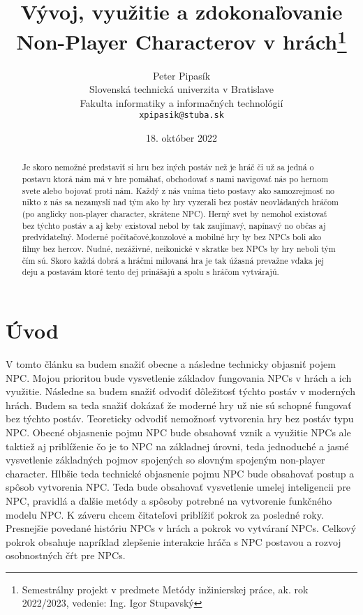 \documentclass[10pt,twoside,slovak,a4paper]{article}
\title{Vývoj, využitie a zdokonaľovanie Non-Player Characterov v hrách\thanks{Semestrálny projekt v predmete Metódy inžinierskej práce, ak. rok 2022/2023, vedenie: Ing. Igor Stupavský}}
\author{Peter Pipasík\\[2pt]
	{\small Slovenská technická univerzita v Bratislave}\\
	{\small Fakulta informatiky a informačných technológií}\\
	{\small \texttt{xpipasik@stuba.sk}}
	}
\date{\small 18. október 2022}
\begin{document}
\maketitle

\begin{abstract}
Je skoro nemožné predstaviť si hru bez iných postáv než je hráč či už sa jedná o postavu ktorá nám má v hre pomáhať, obchodovať s nami navigovať nás po hernom svete alebo bojovať proti nám. Každý z nás vníma tieto postavy ako samozrejmosť no nikto z nás sa nezamyslí nad tým ako by hry vyzerali bez postáv neovládaných hráčom (po anglicky non-player character, skrátene NPC). 
Herný svet by nemohol existovať bez týchto postáv a aj keby existoval nebol by tak zaujímavý, napínavý no občas aj predvídateľný. Moderné počítačové,konzolové a mobilné hry by bez NPCs boli ako filmy bez hercov. Nudné, nezáživné, neikonické v skratke bez NPCs by hry neboli tým čím sú. Skoro každá dobrá a hráčmi milovaná hra je tak úžasná prevažne vďaka jej deju a postavám ktoré tento dej prinášajú a spolu s hráčom vytvárajú.   

\end{abstract}

\section{Úvod}
V tomto článku sa budem snažiť obecne a následne technicky objasniť pojem NPC. Mojou prioritou bude vysvetlenie základov fungovania NPCs v hrách a ich využitie. Následne sa budem snažiť odvodiť dôležitosť týchto postáv v moderných hrách. Budem sa teda snažiť dokázať že moderné hry už nie sú schopné fungovať bez týchto postáv. Teoreticky odvodiť nemožnosť vytvorenia hry bez postáv typu NPC.
Obecné objasnenie pojmu NPC bude obsahovať vznik a využitie NPCs ale taktiež aj priblíženie čo je to NPC na základnej úrovni, teda jednoduché a jasné vysvetlenie základných pojmov spojených so slovným spojeným non-player character.
Hlbšie teda technické objasnenie pojmu NPC bude obsahovať postup a spôsob vytvorenia NPC. Teda bude obsahovať vysvetlenie umelej inteligencii pre NPC, pravidlá a ďalšie metódy a spôsoby potrebné na vytvorenie funkčného modelu NPC. 
K záveru chcem čitateľovi priblížiť pokrok za posledné roky. Presnejšie povedané históriu NPCs v hrách a pokrok vo vytváraní NPCs. Celkový pokrok obsahuje napríklad zlepšenie interakcie hráča s NPC postavou a rozvoj osobnostných čŕt pre NPCs. 
\end{document}
